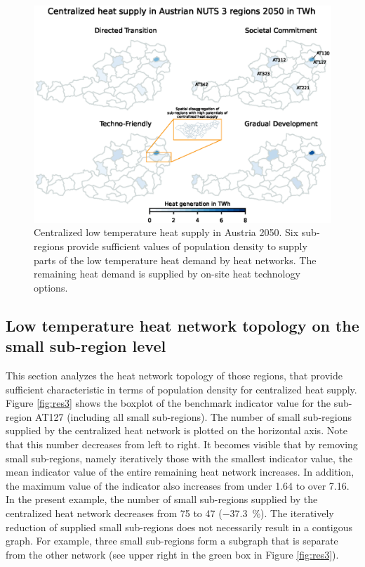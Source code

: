 \begin{figure}
	\centering
	\includegraphics[width=1\linewidth]{figures/4_Results/Heatmap.eps}
	\caption{Centralized low temperature heat supply in Austria 2050. Six sub-regions provide sufficient values of population density to supply parts of the low temperature heat demand by heat networks. The remaining heat demand is supplied by on-site heat technology options. }
	\label{fig:res2}
\end{figure}

\newpage
\subsection{Low temperature heat network topology on the small sub-region level}\label{res:4}
This section analyzes the heat network topology of those regions, that provide sufficient characteristic in terms of population density for centralized heat supply. Figure \ref{fig:res3} shows the boxplot of the benchmark indicator value for the sub-region AT127 (including all small sub-regions). The number of small sub-regions supplied by the centralized heat network is plotted on the horizontal axis. Note that this number decreases from left to right. It becomes visible that by removing small sub-regions, namely iteratively those with the smallest indicator value, the mean indicator value of the entire remaining heat network increases. In addition, the maximum value of the indicator also increases from under 1.64 to over 7.16. In the present example, the number of small sub-regions supplied by the centralized heat network decreases from \SI{75}{} to \SI{47}{} (\SI{-37.3}{\%}). The iteratively reduction of supplied small sub-regions does not necessarily result in a contigous graph. For example, three small sub-regions form a subgraph that is separate from the other network (see upper right in the green box in Figure \ref{fig:res3}).\newline

